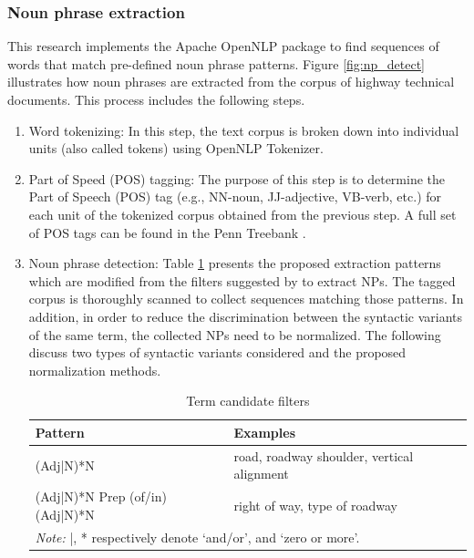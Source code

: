 \documentclass[Journal, BackFigs,NoLists, DoubleSpace]{ascelike}%
\begin{document}
\subsubsection{Noun phrase extraction}
%
This research implements the Apache OpenNLP package to find sequences of words that match pre-defined noun phrase patterns. Figure \ref{fig:np_detect} illustrates how noun phrases are extracted from the corpus of highway technical documents. This process includes the following steps. %
%
\begin{enumerate} [label=\roman*]
\item Word tokenizing: In this step, the text corpus is broken down into individual units (also called tokens) using OpenNLP Tokenizer.
\item Part of Speed (POS) tagging: The purpose of this step is to determine the Part of Speech (POS) tag (e.g., NN-noun, JJ-adjective, VB-verb, etc.) for each unit of the tokenized corpus obtained from the previous step. A full set of POS tags can be found in the Penn Treebank \cite{marcus93}.
\item Noun phrase detection: Table \ref{table:term_filter} presents the proposed extraction patterns which are modified from the filters suggested by  to extract NPs. The tagged corpus is thoroughly scanned to collect sequences matching those patterns. 
In addition, in order to reduce the discrimination between the syntactic variants of the same term, the collected NPs need to be normalized. The following discuss two types of syntactic variants considered and the proposed normalization methods.
\begin{table} [t]
		\caption{Term candidate filters}
		\label{table:term_filter}
		\centering
		\small
		\renewcommand{\arraystretch}{1.25}
		\begin{tabular}{l l}
			\hline
			\textbf{Pattern} & \textbf{Examples}\\
			\hline
			(Adj|N)*N		& road, roadway shoulder, vertical alignment\\
			(Adj|N)*N Prep (of/in) (Adj|N)*N	&	right of way, type of roadway\\
			\hline
			\multicolumn{2}{l}{\textit{Note:} |, * respectively denote `and/or', and `zero or more'.  } \\
			\hline
		\end{tabular}
		\normalsize
\end{table}
\begin{itemize}

\end{itemize}
\end{enumerate}
\end{document}
